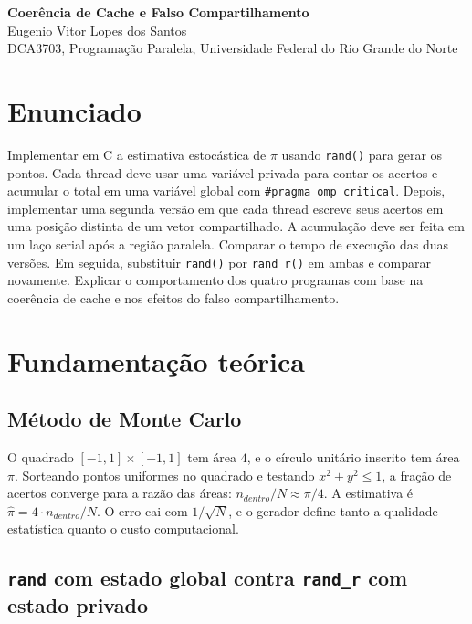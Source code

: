 \documentclass[11pt,letterpaper]{article}
\begin{document}
\pagestyle{plain}

\begin{center}
    {\LARGE\bfseries Coerência de Cache e Falso Compartilhamento}\\[0.4em]
    {\normalsize Eugenio Vitor Lopes dos Santos}\\[0.3em]
    {\small DCA3703, Programação Paralela, Universidade Federal do Rio Grande do Norte}\\[0.3em]
\end{center}

\section{Enunciado}

Implementar em C a estimativa estocástica de $\pi$ usando \texttt{rand()} para gerar os pontos. Cada thread deve usar uma variável privada para contar os acertos e acumular o total em uma variável global com \texttt{\#pragma omp critical}. Depois, implementar uma segunda versão em que cada thread escreve seus acertos em uma posição distinta de um vetor compartilhado. A acumulação deve ser feita em um laço serial após a região paralela. Comparar o tempo de execução das duas versões. Em seguida, substituir \texttt{rand()} por \texttt{rand\_r()} em ambas e comparar novamente. Explicar o comportamento dos quatro programas com base na coerência de cache e nos efeitos do falso compartilhamento.

\section{Fundamentação teórica}

\subsection{Método de Monte Carlo}

O quadrado $[-1,1] \times [-1,1]$ tem área $4$, e o círculo unitário inscrito tem área $\pi$. Sorteando pontos uniformes no quadrado e testando $x^2+y^2 \le 1$, a fração de acertos converge para a razão das áreas: $n_{dentro}/N \approx \pi/4$. A estimativa é $\hat{\pi}=4\cdot n_{dentro}/N$. O erro cai com $1/\sqrt{N}$, e o gerador define tanto a qualidade estatística quanto o custo computacional.

\subsection{\texttt{rand} com estado global contra \texttt{rand\_r} com estado privado}
\end{document}
